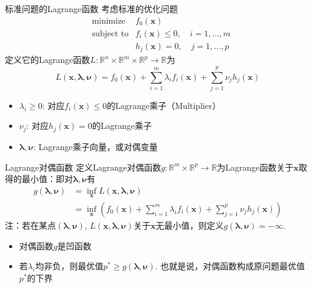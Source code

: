 \begin{frame}

\begin{block}{标准问题的Lagrange函数}
考虑标准的优化问题
\vspace{-0.5em}
\begin{eqnarray*}
& \text{minimize} & f_0(\mathbf{x}) \\
& \text{subject to} & f_i(\mathbf{x}) \le 0, \quad i = 1,\ldots,m \\
& & h_j(\mathbf{x}) = 0, \quad j = 1,\ldots,p
\end{eqnarray*}
定义它的Lagrange函数$L: \mathbb{R}^n \times \mathbb{R}^m \times \mathbb{R}^p \rightarrow \mathbb{R}$为
\vspace{-0.5em}
$$L(\mathbf{x}, \boldsymbol\lambda, \boldsymbol\nu) = f_0(\mathbf{x}) + \sum\limits_{i=1}^m \lambda_i f_i(\mathbf{x}) + \sum\limits_{j=1}^p \nu_j h_j(\mathbf{x})$$
\vspace{-1em}
\begin{itemize}
\item $\lambda_i \ge 0$: 对应$f_i(\mathbf{x}) \le 0$的Lagrange乘子（Multiplier）
\item $\nu_j$: 对应$h_j(\mathbf{x}) = 0$的Lagrange乘子
\item $\boldsymbol\lambda, \boldsymbol\nu$: Lagrange乘子向量，或对偶变量
\end{itemize}
\end{block}

\end{frame}


\begin{frame}

\begin{block}{Lagrange对偶函数}
定义Lagrange对偶函数$g: \mathbb{R}^m \times \mathbb{R}^p \rightarrow \mathbb{R}$为Lagrange函数关于$\mathbf{x}$取得的最小值：即对$\boldsymbol\lambda, \boldsymbol\nu$有
\begin{align*}
g(\boldsymbol\lambda, \boldsymbol\nu) & = \inf\limits_{\mathbf{x}} L(\mathbf{x}, \boldsymbol\lambda, \boldsymbol\nu) \\
& = \inf\limits_{\mathbf{x}} \left( f_0(\mathbf{x}) + \sum\limits_{i=1}^m \lambda_i f_i(\mathbf{x}) + \sum\limits_{j=1}^p \nu_j h_j(\mathbf{x}) \right)
\end{align*}
注：若在某点$(\boldsymbol\lambda, \boldsymbol\nu)$, $L(\mathbf{x}, \boldsymbol\lambda, \boldsymbol\nu)$关于$\mathbf{x}$无最小值，则定义$g(\boldsymbol\lambda, \boldsymbol\nu) = -\infty$.

\vspace{0.7em}
\pause

\begin{itemize}
\item 对偶函数$g$是凹函数
\item 若$\lambda_i$均非负，则最优值$p^* \ge g(\boldsymbol\lambda, \boldsymbol\nu)$. 也就是说，对偶函数构成原问题最优值$p^*$的下界
\end{itemize}
\end{block}

\end{frame}


